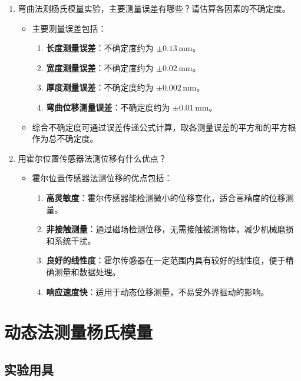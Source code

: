 \documentclass[zihao=5, UTF8]{article}
\theoremstyle{MyLineTheoremStyle} %
\theoremstyle{MyBlockTheoremStyle} %
\theoremstyle{MySubsubsectionStyle} %
\begin{document}
\begin{enumerate}
    \item 弯曲法测杨氏模量实验，主要测量误差有哪些？请估算各因素的不确定度。
    \begin{itemize}
        \item 主要测量误差包括：
        \begin{enumerate}
            \item \textbf{长度测量误差}：不确定度约为 $\pm 0.13 \, \text{mm}$。
            \item \textbf{宽度测量误差}：不确定度约为 $\pm 0.02 \, \text{mm}$。
            \item \textbf{厚度测量误差}：不确定度约为 $\pm 0.002 \, \text{mm}$。
            \item \textbf{弯曲位移测量误差}：不确定度约为 $\pm 0.01 \, \text{mm}$。
        \end{enumerate}
        \item 综合不确定度可通过误差传递公式计算，取各测量误差的平方和的平方根作为总不确定度。
    \end{itemize}
    
    \item 用霍尔位置传感器法测位移有什么优点？
    \begin{itemize}
        \item 霍尔位置传感器法测位移的优点包括：
        \begin{enumerate}
            \item \textbf{高灵敏度}：霍尔传感器能检测微小的位移变化，适合高精度的位移测量。
            \item \textbf{非接触测量}：通过磁场检测位移，无需接触被测物体，减少机械磨损和系统干扰。
            \item \textbf{良好的线性度}：霍尔传感器在一定范围内具有较好的线性度，便于精确测量和数据处理。
            \item \textbf{响应速度快}：适用于动态位移测量，不易受外界振动的影响。
        \end{enumerate}
    \end{itemize}
\end{enumerate}





\section{动态法测量杨氏模量}

\subsection{实验用具}
\end{document}
